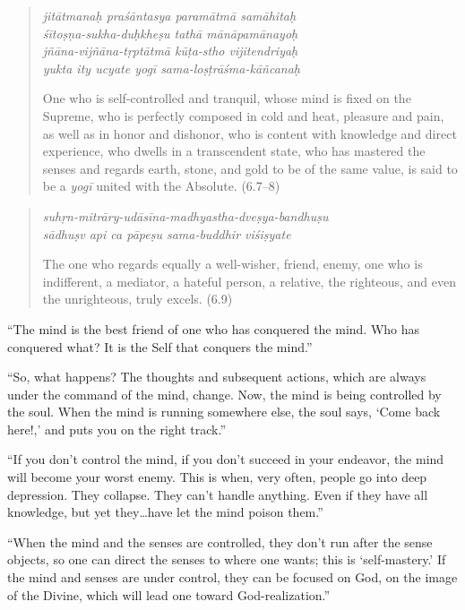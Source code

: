 \documentclass[12pt, twoside, openright]{memoir}
\begin{document}
\par
\begin{verse}
\textit{jitātmanaḥ praśāntasya paramātmā samāhitaḥ} \\
\textit{śītoṣṇa-sukha-duḥkheṣu tathā mānāpamānayoḥ} \\
\textit{jñāna-vijñāna-tṛptātmā kūṭa-stho vijitendriyaḥ} \\
\textit{yukta ity ucyate yogī sama-loṣṭrāśma-kāñcanaḥ}

\noindent One who is self-controlled and tranquil, whose mind is fixed on the Supreme, who is perfectly composed in cold and heat, pleasure and pain, as well as in honor and dishonor, who is content with knowledge and direct experience, who dwells in a transcendent state, who has mastered the senses and regards earth, stone, and gold to be of the same value, is said to be a \textit{yogī} united with the Absolute. (6.7–8)
\end{verse}
\par



\par
\begin{verse}
\textit{suhṛn-mitrāry-udāsīna-madhyastha-dveṣya-bandhuṣu} \\
\textit{sādhuṣv api ca pāpeṣu sama-buddhir viśiṣyate}

\noindent The one who regards equally a well-wisher, friend, enemy, one who is indifferent, a mediator, a hateful person, a relative, the righteous, and even the unrighteous, truly excels. (6.9)
\end{verse}
\par


\enquote{The mind is the best friend of one who has conquered the mind. Who has conquered what? It is the Self that conquers the mind.}

\enquote{So, what happens? The thoughts and subsequent actions, which are always under the command of the mind, change. Now, the mind is being controlled by the soul. When the mind is running somewhere else, the soul says, \enquote{Come back here!,} and puts you on the right track.}

\enquote{If you don’t control the mind, if you don’t succeed in your endeavor, the mind will become your worst enemy. This is when, very often, people go into deep depression. They collapse. They can’t handle anything. Even if they have all knowledge, but yet they\ldots have let the mind poison them.}

\enquote{When the mind and the senses are controlled, they don’t run after the sense objects, so one can direct the senses to where one wants; this is \enquote{self-mastery.} If the mind and senses are under control, they can be focused on God, on the image of the Divine, which will lead one toward God-realization.}
\end{document}
